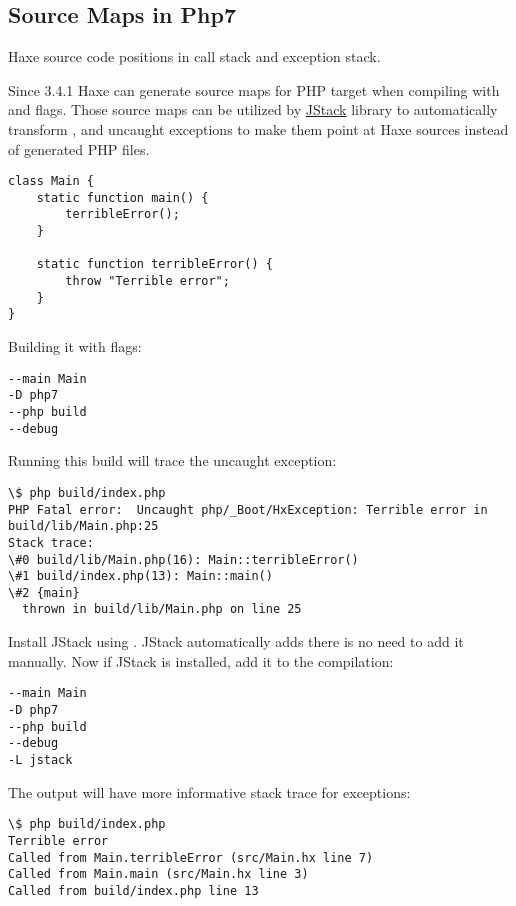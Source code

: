 \subsection{Source Maps in Php7}
\label{debugging-sourcemap-php7}

Haxe source code positions in call stack and exception stack.

Since 3.4.1 Haxe can generate source maps for PHP target when compiling with  and  flags.
Those source maps can be utilized by \href{https://lib.haxe.org/p/jstack/}{JStack} library to automatically transform ,  and uncaught exceptions to make them point at Haxe sources instead of generated PHP files.


\begin{lstlisting}
class Main {
	static function main() {
		terribleError();
	}

	static function terribleError() {
		throw "Terrible error";
	}
}
\end{lstlisting}

Building it with flags:

\begin{lstlisting}
--main Main
-D php7
--php build
--debug
\end{lstlisting}

Running this build will trace the uncaught exception:

\begin{lstlisting}
\$ php build/index.php
PHP Fatal error:  Uncaught php/_Boot/HxException: Terrible error in build/lib/Main.php:25
Stack trace:
\#0 build/lib/Main.php(16): Main::terribleError()
\#1 build/index.php(13): Main::main()
\#2 {main}
  thrown in build/lib/Main.php on line 25
\end{lstlisting}

Install JStack using . JStack automatically adds  there is no need to add it manually.
Now if JStack is installed, add it to the compilation:

\begin{lstlisting}
--main Main
-D php7
--php build
--debug
-L jstack
\end{lstlisting}

The output will have more informative stack trace for exceptions:

\begin{lstlisting}
\$ php build/index.php
Terrible error
Called from Main.terribleError (src/Main.hx line 7)
Called from Main.main (src/Main.hx line 3)
Called from build/index.php line 13
\end{lstlisting}
